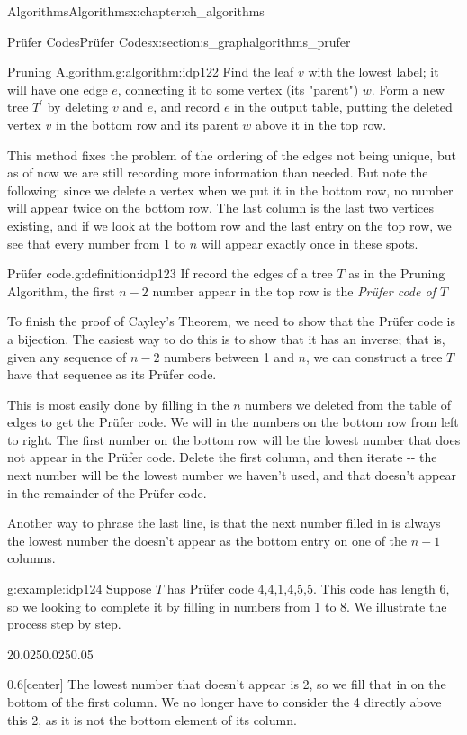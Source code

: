 \documentclass[oneside,10pt,]{book}
\numberwithin{equation}{section}
\begin{document}
\begin{chapterptx}{Algorithms}{}{Algorithms}{}{}{x:chapter:ch_algorithms}
\begin{sectionptx}{Prüfer Codes}{}{Prüfer Codes}{}{}{x:section:s_graphalgorithms_prufer}
\begin{algorithm}{Pruning Algorithm.}{}{g:algorithm:idp122}
Find the leaf \(v\) with the lowest label; it will have one edge \(e\), connecting it to some vertex (its "parent") \(w\).   Form a new tree \(T^\prime\) by deleting \(v\) and \(e\), and record \(e\) in the output table, putting the deleted vertex \(v\) in the bottom row and its parent \(w\) above it in the top row.%
\end{algorithm}
This method fixes the problem of the ordering of the edges not being unique, but as of now we are still recording more information than needed.  But note the following: since we delete a vertex when we put it in the bottom row, no number will appear twice on the bottom row.  The last column is the last two vertices existing, and if we look at the bottom row and the last entry on the top row, we see that every number from 1 to \(n\) will appear exactly once in these spots.%
\begin{definition}{Prüfer code.}{g:definition:idp123}%
If record the edges of a tree \(T\) as in the Pruning Algorithm, the first \(n-2\) number appear in the top row is the \emph{Prüfer code of \(T\)}%
\end{definition}
To finish the proof of Cayley's Theorem, we need to show that the Prüfer code is a bijection.  The easiest way to do this is to show that it has an inverse; that is, given any sequence of \(n-2\) numbers between 1 and \(n\), we can construct a tree \(T\) have that sequence as its Prüfer code.%
\par
This is most easily done by filling in the \(n\) numbers we deleted from the table of edges to get the Prüfer code.  We will in the numbers on the bottom row from left to right.  The first number on the bottom row will be the lowest number that does not appear in the Prüfer code.  Delete the first column, and then iterate -{}-{} the next number will be the lowest number we haven't used, and that doesn't appear in the remainder of the Prüfer code.%
\par
Another way to phrase the last line, is that the next number filled in is always the lowest number the doesn't appear as the bottom entry on one of the \(n-1\) columns.%
\begin{example}{}{g:example:idp124}%
Suppose \(T\) has Prüfer code 4,4,1,4,5,5. This code has length 6, so we looking to complete it by filling in numbers from 1 to 8. We illustrate the process step by step.%
\begin{sidebyside}{2}{0.025}{0.025}{0.05}%
\begin{sbspanel}{0.6}[center]%
The lowest number that doesn't appear is 2, so we fill that in on the bottom of the first column. We no longer have to consider the 4 directly above this 2, as it is not the bottom element of its column.%

\end{sbspanel}
\end{sidebyside}
\end{example}
\end{sectionptx}
\end{chapterptx}
\end{document}
